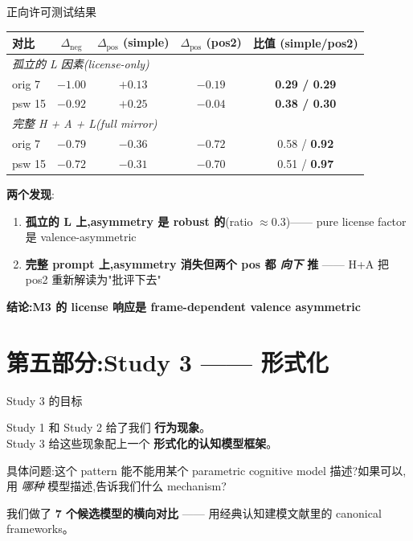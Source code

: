 \documentclass[aspectratio=169,11pt]{ctexbeamer}
\newcommand{\hi}[1]{\textcolor{ow-red}{\textbf{#1}}}
\newcommand{\hib}[1]{\textcolor{ow-blue}{\textbf{#1}}}
\begin{document}
\begin{frame}{正向许可测试结果}
\small
\begin{center}
\begin{tabular}{lcccc}
\toprule
对比 & $\Delta_\text{neg}$ & $\Delta_\text{pos}$ (simple) & $\Delta_\text{pos}$ (pos2) & 比值 (simple/pos2) \\
\midrule
\multicolumn{5}{l}{\textit{孤立的 L 因素(license-only)}} \\
\quad orig 7 & $-1.00$ & $+0.13$ & $-0.19$ & \hi{0.29 / 0.29} \\
\quad psw 15 & $-0.92$ & $+0.25$ & $-0.04$ & \hi{0.38 / 0.30} \\
\midrule
\multicolumn{5}{l}{\textit{完整 H + A + L(full mirror)}} \\
\quad orig 7 & $-0.79$ & $-0.36$ & $-0.72$ & 0.58 / \hib{0.92} \\
\quad psw 15 & $-0.72$ & $-0.31$ & $-0.70$ & 0.51 / \hib{0.97} \\
\bottomrule
\end{tabular}
\end{center}

\bigskip
\textbf{两个发现}:
\begin{enumerate}
\item \hi{孤立的 L 上,asymmetry 是 robust 的}(ratio $\approx 0.3$)—— pure license factor 是 valence-asymmetric
\item \hi{完整 prompt 上,asymmetry 消失但两个 pos 都 \emph{向下} 推} —— H+A 把 pos2 重新解读为"批评下去"
\end{enumerate}

\bigskip
\hib{结论:M3 的 license 响应是 frame-dependent valence asymmetric}
\end{frame}

\section{第五部分:Study 3 —— 形式化}

\begin{frame}{Study 3 的目标}

Study 1 和 Study 2 给了我们 \hib{行为现象}。\\
Study 3 给这些现象配上一个 \hi{形式化的认知模型框架}。

\bigskip
具体问题:这个 pattern 能不能用某个 parametric cognitive model 描述?如果可以,用 \emph{哪种} 模型描述,告诉我们什么 mechanism?

\bigskip
我们做了 \hi{7 个候选模型的横向对比} —— 用经典认知建模文献里的 canonical frameworks。
\end{frame}
\end{document}
